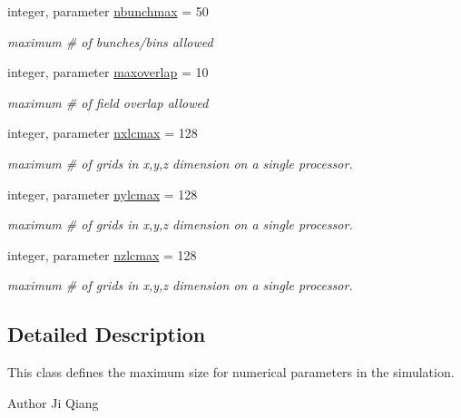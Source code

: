 \begin{DoxyCompactItemize}
integer, parameter \mbox{\hyperlink{namespacenumconstclass_ac218e74533123f49148ceb12b1d3b16e}{nbunchmax}} = 50
\begin{DoxyCompactList}\small\item\em maximum \# of bunches/bins allowed \end{DoxyCompactList}\item 
integer, parameter \mbox{\hyperlink{namespacenumconstclass_a4b7c578c9dcac7c1d356b2aabe7c3cb6}{maxoverlap}} = 10
\begin{DoxyCompactList}\small\item\em maximum \# of field overlap allowed \end{DoxyCompactList}\end{DoxyCompactItemize}
\textbf{ }\par
\begin{DoxyCompactItemize}
\item 
integer, parameter \mbox{\hyperlink{namespacenumconstclass_a8219d90b9dea3ecb8b630e32e3c86026}{nxlcmax}} = 128
\begin{DoxyCompactList}\small\item\em maximum \# of grids in x,y,z dimension on a single processor. \end{DoxyCompactList}\item 
integer, parameter \mbox{\hyperlink{namespacenumconstclass_ab087d448ac5f3b93904c966d5790fdf2}{nylcmax}} = 128
\begin{DoxyCompactList}\small\item\em maximum \# of grids in x,y,z dimension on a single processor. \end{DoxyCompactList}\item 
integer, parameter \mbox{\hyperlink{namespacenumconstclass_a11dbfc82160f0abca94e67bc7811d3ea}{nzlcmax}} = 128
\begin{DoxyCompactList}\small\item\em maximum \# of grids in x,y,z dimension on a single processor. \end{DoxyCompactList}\end{DoxyCompactItemize}



\subsection{Detailed Description}
This class defines the maximum size for numerical parameters in the simulation. 

\begin{DoxyAuthor}{Author}
Ji Qiang 
\end{DoxyAuthor}


